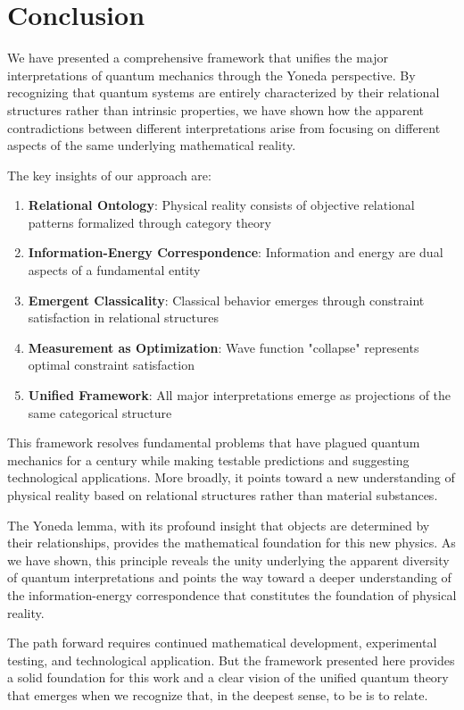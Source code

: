 \documentclass[12pt,a4paper]{article}
\begin{document}
\section{Conclusion}

We have presented a comprehensive framework that unifies the major interpretations of quantum mechanics through the Yoneda perspective. By recognizing that quantum systems are entirely characterized by their relational structures rather than intrinsic properties, we have shown how the apparent contradictions between different interpretations arise from focusing on different aspects of the same underlying mathematical reality.

The key insights of our approach are:
\begin{enumerate}
\item \textbf{Relational Ontology}: Physical reality consists of objective relational patterns formalized through category theory
\item \textbf{Information-Energy Correspondence}: Information and energy are dual aspects of a fundamental entity
\item \textbf{Emergent Classicality}: Classical behavior emerges through constraint satisfaction in relational structures
\item \textbf{Measurement as Optimization}: Wave function "collapse" represents optimal constraint satisfaction
\item \textbf{Unified Framework}: All major interpretations emerge as projections of the same categorical structure
\end{enumerate}

This framework resolves fundamental problems that have plagued quantum mechanics for a century while making testable predictions and suggesting technological applications. More broadly, it points toward a new understanding of physical reality based on relational structures rather than material substances.

The Yoneda lemma, with its profound insight that objects are determined by their relationships, provides the mathematical foundation for this new physics. As we have shown, this principle reveals the unity underlying the apparent diversity of quantum interpretations and points the way toward a deeper understanding of the information-energy correspondence that constitutes the foundation of physical reality.

The path forward requires continued mathematical development, experimental testing, and technological application. But the framework presented here provides a solid foundation for this work and a clear vision of the unified quantum theory that emerges when we recognize that, in the deepest sense, to be is to relate.
\end{document}
